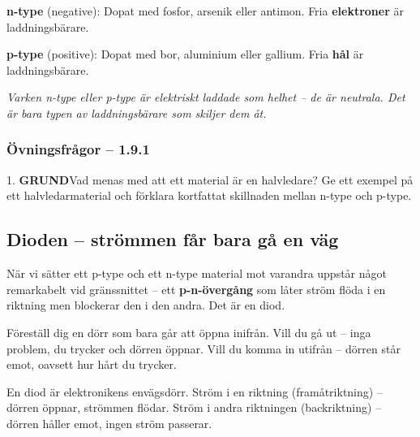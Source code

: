 \documentclass[a4paper,11pt,twoside]{book}
\newcommand{\emoji}[1]{{\emojifont #1}}
\newcommand{\qgrund}{\colorbox{greenpale}{\textcolor{greendark}{\headingfont\bfseries\tiny GRUND}}}
\begin{document}
\begin{bluebox}[title={\emoji{🔑} n-type och p-type kisel}]
\textbf{n-type} (negative): Dopat med fosfor, arsenik eller
antimon. Fria \textbf{elektroner} är laddningsbärare.

\medskip
\textbf{p-type} (positive): Dopat med bor, aluminium eller
gallium. Fria \textbf{hål} är laddningsbärare.

\medskip
{\small\itshape Varken n-type eller p-type är elektriskt laddade
som helhet -- de är neutrala. Det är bara \emph{typen} av
laddningsbärare som skiljer dem åt.}
\end{bluebox}

\subsubsection*{Övningsfrågor -- 1.9.1}

\begin{qblock}{1.}
\qgrund\quad Vad menas med att ett material är en halvledare?
Ge ett exempel på ett halvledarmaterial och förklara kortfattat
skillnaden mellan n-type och p-type.
\end{qblock}

\subsection{Dioden -- strömmen får bara gå en väg}

När vi sätter ett p-type och ett n-type material mot varandra
uppstår något remarkabelt vid gränssnittet -- ett \textbf{p-n-övergång}
som låter ström flöda i en riktning men blockerar den i den andra.
Det är en diod.

\begin{storybox}[{\emoji{🚪} Envägsdörren}]
Föreställ dig en dörr som bara går att öppna inifrån. Vill du
gå ut -- inga problem, du trycker och dörren öppnar. Vill du
komma in utifrån -- dörren står emot, oavsett hur hårt du trycker.

En diod är elektronikens envägsdörr. Ström i en riktning
(framåtriktning) -- dörren öppnar, strömmen flödar. Ström i
andra riktningen (backriktning) -- dörren håller emot,
ingen ström passerar.
\end{storybox}
\end{document}
